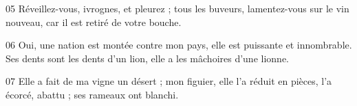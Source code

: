 
05 Réveillez-vous, ivrognes, et pleurez ; tous les buveurs, lamentez-vous sur le vin nouveau, car il est retiré de votre bouche.

06 Oui, une nation est montée contre mon pays, elle est puissante et innombrable. Ses dents sont les dents d’un lion, elle a les mâchoires d’une lionne.

07 Elle a fait de ma vigne un désert ; mon figuier, elle l’a réduit en pièces, l’a écorcé, abattu ; ses rameaux ont blanchi.
